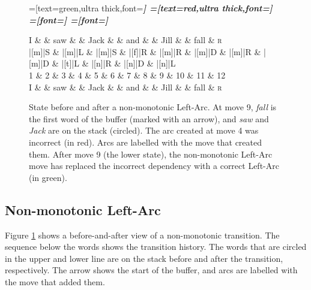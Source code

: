\documentclass[11pt,letterpaper]{article}
\begin{document}
\begin{figure}
    \centering
    \begin{dependency}[theme=simple]
        =[text=green,ultra thick,font=\bfseries\itshape]
        =[text=red,ultra thick,font=\bfseries\itshape]
        =[font=\bfseries\itshape]
        =[font=\itshape]

        \begin{deptext}[column sep=.075cm, row sep=.1ex]
            I \&           \& saw \&          \& Jack       \& \& and     \&           \& Jill   \&  \& fall \& \textsc{r} \\
|[m]|S \& |[m]|L \& |[m]|S   \& |[f]|R \& |[m]|R \& |[m]|D \& |[m]|R \& |[m]|D \& |[t]|L \& |[n]|R \& |[n]|D \& |[n]|L \\
            1 \&     2       \& 3  \&   4      \& 5          \& 6 \& 7     \& 8 \& 9 \& 10 \& 11 \& 12 \\
    I \&           \& saw \&          \& Jack       \& \& and     \&           \& Jill   \&      \& fall \& \textsc{r} \\
        \end{deptext}
    
    
\end{dependency}
\caption{
\small
    State before and after a non-monotonic Left-Arc.
    At move 9, \emph{fall} is the first word of the buffer (marked with an arrow),
    and \emph{saw} and \emph{Jack} are on the stack (circled). The arc created at move 4 was
    incorrect (in red). Arcs are labelled with the move that created them.
    After move 9 (the lower state), the non-monotonic Left-Arc move
    has replaced the incorrect dependency with a correct Left-Arc (in green).
\label{fig:clobber}}
\end{figure}


\subsection{Non-monotonic Left-Arc}

Figure \ref{fig:clobber} shows a before-and-after view of a non-monotonic
transition. The sequence below the words shows the transition history.
The words that are circled in the upper and lower line are on the stack before
and after the transition, respectively. The arrow shows the start of the buffer,
and arcs are labelled with the move that added them. 
\end{document}
